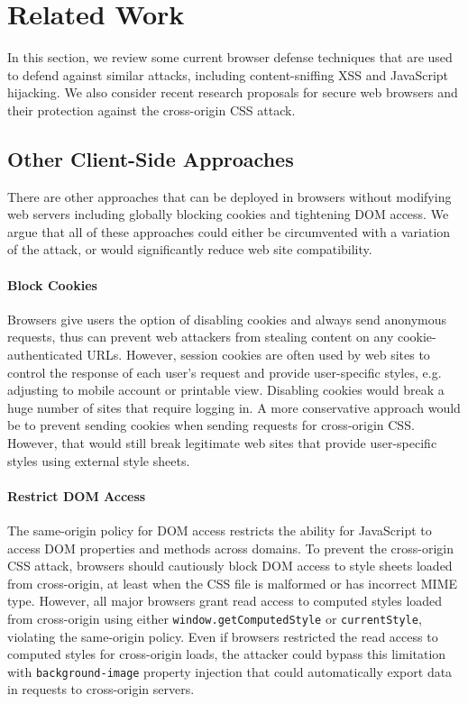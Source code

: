 \documentclass{acm_proc_article-sp}
\begin{document}
\section{Related Work} \label{sec:relatedwork}
In this section, we review some current browser defense techniques that are
used to defend against similar attacks, including content-sniffing XSS and
JavaScript hijacking. We also consider recent research proposals for secure
web browsers and their protection against the cross-origin CSS attack.

\subsection{Other Client-Side Approaches}
There are other approaches that can be deployed in browsers without modifying web servers including globally blocking cookies and tightening DOM access.  We argue that all of these approaches could either be circumvented with a variation of the attack, or would significantly reduce web site compatibility.

\paragraph{Block Cookies}
Browsers give users the option of disabling cookies and always send anonymous requests, thus can prevent web attackers from stealing content on any cookie-authenticated URLs. However, session cookies are often used by web sites to control the response of each user's request and provide user-specific styles, e.g. adjusting to mobile account or printable view. Disabling cookies would break a huge number of sites that require logging in. A more conservative approach would be to prevent sending cookies when sending requests for cross-origin CSS. However, that would still break legitimate web sites that provide user-specific styles using external style sheets.

\paragraph{Restrict DOM Access}
The same-origin policy for DOM access restricts the ability for JavaScript to access DOM properties and methods across domains. To prevent the cross-origin CSS attack, browsers should cautiously block DOM access to style sheets loaded from cross-origin, at least when the CSS file is malformed or has incorrect MIME type. However, all major browsers grant read access to computed styles loaded from cross-origin using either \texttt{window.getComputedStyle} or \texttt{currentStyle}, violating the same-origin policy. Even if browsers restricted the read access to computed styles for cross-origin loads, the attacker could bypass this limitation with \texttt{background-image} property injection that could automatically export data in requests to cross-origin servers.
\end{document}
